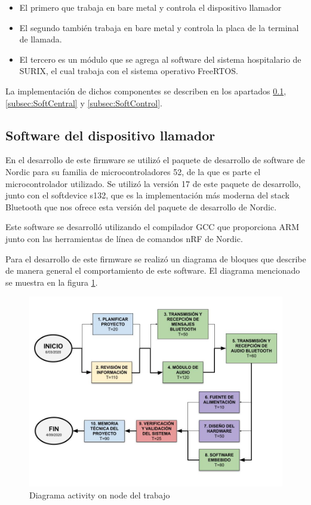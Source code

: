 \begin{itemize}

\item El primero que trabaja en bare metal y controla el dispositivo llamador

\item El segundo también trabaja en bare metal y controla la placa de la terminal de llamada.

\item El tercero es un módulo que se agrega al software del sistema hospitalario de SURIX, el cual trabaja con el sistema operativo FreeRTOS.

\end{itemize}

La implementación de dichos componentes se describen en los apartados \ref{subsec:SoftLlam}, \ref{subsec:SoftCentral} y \ref{subsec:SoftControl}.

\subsection{Software del dispositivo llamador}
\label{subsec:SoftLlam}

En el desarrollo de este firmware se utilizó el paquete de desarrollo de software de Nordic para su familia de microcontroladores 52, de la que es parte el microcontrolador utilizado. Se utilizó la versión 17 de este paquete de desarrollo,  junto con el softdevice s132, que es la implementación más moderna del stack Bluetooth que nos ofrece esta versión del paquete de desarrollo de Nordic.

Este software se desarrolló utilizando el compilador GCC que proporciona ARM junto con las herramientas de línea de comandos nRF de Nordic.

Para el desarrollo de este firmware se realizó un diagrama de bloques que describe de manera general el comportamiento de este software. El diagrama mencionado se muestra en la figura \ref{fig:DiagramaSoftLlam}.

\begin{figure}[htpb]
	\centering
	\includegraphics[scale=0.4]{./Figures/ActivityOnNode.jpg}
	\caption{Diagrama activity on node del trabajo}
	\label{fig:DiagramaSoftLlam}
\end{figure}

